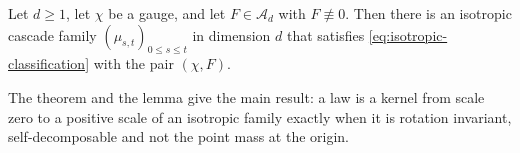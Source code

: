 \begin{lemma}\label{lem:isotropic-realisation}
Let $d \ge 1$, let $\chi$ be a gauge, and let $F \in \mathcal{A}_d$ with $F \not\equiv 0$. Then
there is an isotropic cascade family $(\mu_{s,t})_{0 \le s \le t}$ in dimension $d$ that satisfies
\ref{eq:isotropic-classification} with the pair $(\chi, F)$.
\end{lemma}

The theorem and the lemma give the main result: a law is a kernel from scale zero to a positive
scale of an isotropic family exactly when it is rotation invariant, self-decomposable and not the point
mass at the origin.

